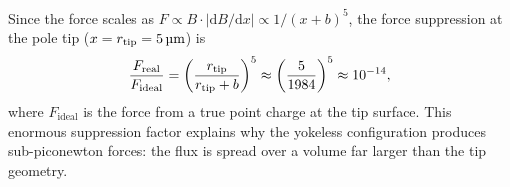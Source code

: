 Since the force scales as $F \propto B \cdot |\mathrm{d}B/\mathrm{d}x|
\propto 1/(x+b)^5$, the force suppression at the pole tip
($x = \rtip = \SI{5}{\um}$) is
\begin{equation}
\frac{F_\mathrm{real}}{F_\mathrm{ideal}} = \left(\frac{r_\mathrm{tip}}{r_\mathrm{tip} + b}\right)^5
\approx \left(\frac{5}{1984}\right)^5 \approx 10^{-14},
\end{equation}
where $F_\mathrm{ideal}$ is the force from a true point charge at the tip
surface. This enormous suppression factor explains why the yokeless
configuration produces sub-piconewton forces: the flux is spread over a
volume far larger than the tip geometry.
